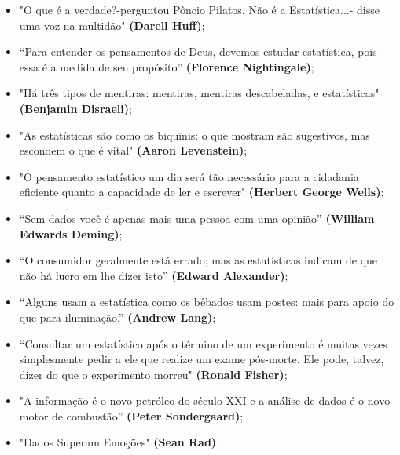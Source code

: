 \begin{itemize}
 \item "O que é a verdade?-perguntou Pôncio Pilatos. Não é a Estatística...- disse uma voz na multidão" \textbf{(Darell Huff)};
 \item “Para entender os pensamentos de Deus, devemos estudar estatística, pois essa é a medida de seu propósito” \textbf{(Florence Nightingale)};
  \item "Há três tipos de mentiras: mentiras, mentiras descabeladas, e estatísticas" \textbf{(Benjamin Disraeli)};
 \item "As estatísticas são como os biquinis: o que mostram são sugestivos, mas escondem o que é vital" \textbf{(Aaron Levenstein)};
\item "O pensamento estatístico um dia será tão necessário para a cidadania eficiente quanto a capacidade de ler e escrever" \textbf{(Herbert George Wells)};
\item “Sem dados você é apenas mais uma pessoa com uma opinião” \textbf{(William Edwards Deming)};
\item “O consumidor geralmente está errado; mas as estatísticas indicam de que não há lucro em lhe dizer isto” \textbf{(Edward Alexander)};
\item “Alguns usam a estatística como os bêbados usam postes: mais para apoio do que para iluminação.” \textbf{(Andrew Lang)};
\item “Consultar um estatístico após o término de um experimento é muitas vezes simplesmente pedir a ele que realize um exame pós-morte. Ele pode, talvez, dizer do que o experimento morreu" \textbf{(Ronald Fisher)};
\item "A informação é o novo petróleo do século XXI e a análise de dados é o novo motor de combustão” \textbf{(Peter Sondergaard)};
\item "Dados Superam Emoções" \textbf{(Sean Rad)}.
\end{itemize}